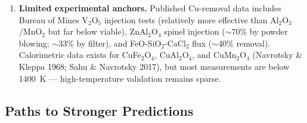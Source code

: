 \documentclass[11pt]{article}
\begin{document}
\begin{enumerate}[leftmargin=*]
    \item \textbf{Limited experimental anchors.} Published Cu-removal data includes Bureau of Mines V$_2$O$_5$ injection tests (relatively more effective than Al$_2$O$_3$/MnO$_2$ but far below viable), ZnAl$_2$O$_4$ spinel injection ($\sim$70\% by powder blowing; $\sim$33\% by filter), and FeO-SiO$_2$-CaCl$_2$ flux ($\sim$40\% removal). Calorimetric data exists for CuFe$_2$O$_4$, CuAl$_2$O$_4$, and CuMn$_2$O$_4$ (Navrotsky \& Kleppa 1968; Sahu \& Navrotsky 2017), but most measurements are below 1400~K --- high-temperature validation remains sparse.
\end{enumerate}

\subsection{Paths to Stronger Predictions}
\end{document}
